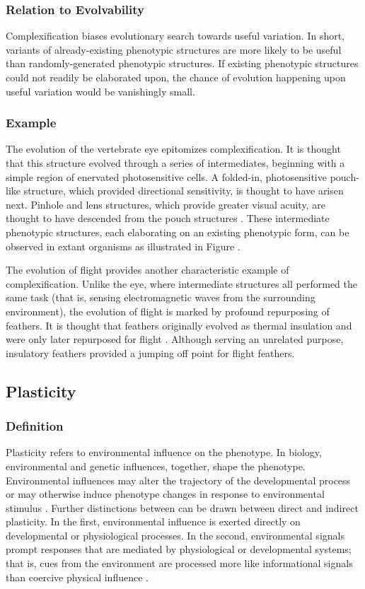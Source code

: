 \subsubsection{Relation to Evolvability}
Complexification biases evolutionary search towards useful variation. In short, variants of already-existing phenotypic structures are more likely to be useful than randomly-generated phenotypic structures.\mindmapmark{\usefulvariationcomplexification} If existing phenotypic structures could not readily be elaborated upon, the chance of evolution happening upon useful variation would be vanishingly small.

\subsubsection{Example}
The evolution of the vertebrate eye epitomizes complexification. It is thought that this structure evolved through a series of intermediates, beginning with a simple region of enervated photosensitive cells. A folded-in,  photosensitive pouch-like structure, which provided directional sensitivity, is thought to have arisen next. Pinhole and lens structures, which provide greater visual acuity, are thought to have descended from the pouch structures \cite{Gregory2008TheOrgans}. These intermediate phenotypic structures, each elaborating on an existing phenotypic form, can be observed in extant organisms as illustrated in Figure .

The evolution of flight provides another characteristic example of complexification. Unlike the eye, where intermediate structures all performed the same task (that is, sensing electromagnetic waves from the surrounding environment), the evolution of flight is marked by profound repurposing of feathers. It is thought that feathers originally evolved as thermal insulation and were only later repurposed for flight \cite{Gould1982Exaptation-aForm}. Although serving an unrelated purpose, insulatory feathers provided a jumping off point for flight feathers.

\subsection{Plasticity} \label{sec:plasticity}
\subsubsection{Definition}
Plasticity refers to environmental influence on the phenotype. In biology, environmental and genetic influences, together, shape the phenotype. Environmental influences may alter the trajectory of the developmental process or may otherwise induce phenotype changes in response to environmental stimulus \cite{Fusco2010PhenotypicConcepts}. Further distinctions between can be drawn between direct and indirect plasticity. In the first, environmental influence is exerted directly on developmental or physiological processes. In the second, environmental signals prompt responses that are mediated by physiological or developmental systems; that is, cues from the environment are processed more like informational signals than coercive physical influence \cite{Fusco2010PhenotypicConcepts}.

